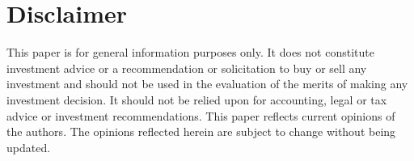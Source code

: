 \documentclass[sigconf,nonacm,prologue,table]{acmart}
\begin{document}
% 
% 

\section*{Disclaimer}

This paper is for general information purposes only. It does not constitute investment advice or a recommendation or solicitation to buy or sell any investment and should not be used in the evaluation of the merits of making any investment decision. It should not be relied upon for accounting, legal or tax advice or investment recommendations.  This paper reflects current opinions of the authors. The opinions reflected herein are subject to change without being updated. 

\pagebreak
{}
\end{document}
